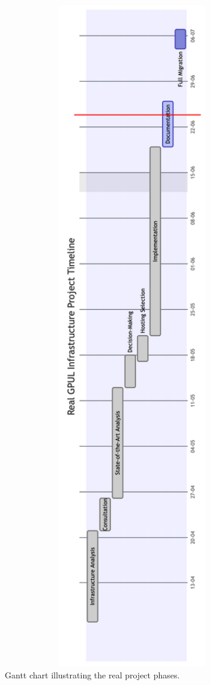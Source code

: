 \begin{figure}[H]
  \centering
  \includegraphics[width=1\textwidth]{imaxes/gantt-real.png}
  \caption{Gantt chart illustrating the real project phases.}
  \label{fig:gantt-real}
\end{figure}

